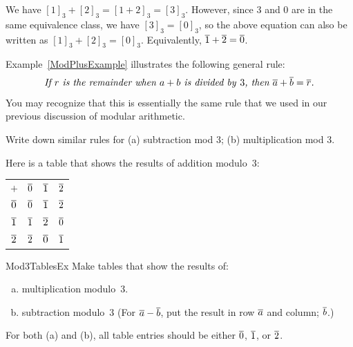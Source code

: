 \begin{eg}\label{ModPlusExample}
We have $[1]_3 + [2]_3 = [1 + 2]_3 = [3]_3$. However, since 3 and 0 are in the same equivalence class, we have $[3]_3 = [0]_3$, so the above equation can also be written as $[1]_3 + [2]_3 = [0]_3$. Equivalently, $\overline{1} + \overline{2} = \overline{0}$.
\end{eg}

Example~\ref{ModPlusExample} illustrates the following general rule:
$$ \text{%
\it If $r$ is the remainder when $a + b$ is divided by\/~$3$, then $\class{a} + \class{b} = \class{r}$.} $$
You may recognize that this is essentially the same rule that we used in our previous discussion of modular arithmetic.

\begin{exercise}{47}
Write down similar rules for (a) subtraction mod 3; (b) multiplication mod 3.
\end{exercise}

\begin{eg}
Here is a table that shows the results of addition modulo~$3$:
\begin{center} \begin{tabular}{c||c|c|c}
$+$&$\overline{0}$&$\overline{1}$&$\overline{2}$ \\
\noalign{\hrule}
\noalign{\smallskip}
\noalign{\hrule}
$\overline{0}$&$\overline{0}$&$\overline{1}$&$\overline{2}$ \\
\noalign{\hrule}
$\overline{1}$&$\overline{1}$&$\overline{2}$&$\overline{0}$ \\
\noalign{\hrule}
$\overline{2}$&$\overline{2}$&$\overline{0}$&$\overline{1}$ \\
\end{tabular}
\end{center}
\end{eg}


\begin{exercise}{Mod3TablesEx}
Make tables that show the results of:
\begin{enumerate}[(a)]
\item \label{Mod3TablesEx-multiplication}
multiplication modulo~$3$.
\item \label{Mod3TablesEx-subtraction}
subtraction modulo~$3$ (For $\overline{a} - \overline{b}$,  put the result in row $\overline{a}$ and column; $\overline{b}$.)
\end{enumerate}
For both (a) and (b), all table entries should be  either\/ $\overline{0}$, $\overline{1}$, or\/ $\overline{2}$.
\end{exercise}



